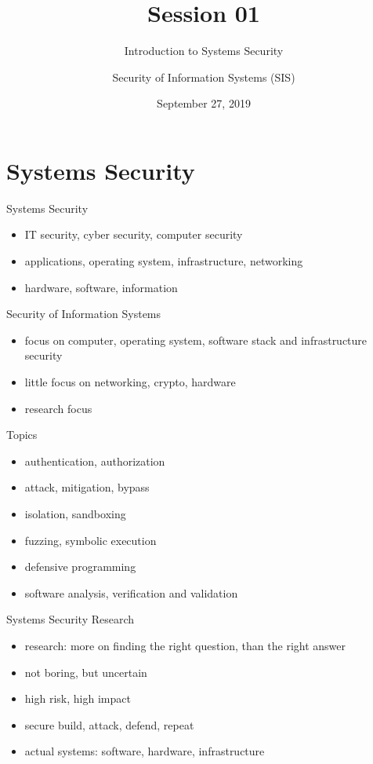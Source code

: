\documentclass{curs}
\title[Session 01]{Session 01}
\subtitle{Introduction to Systems Security}
\author{Security of Information Systems (SIS)}
\date{September 27, 2019}
\begin{document}
\frame{\titlepage}


\section{Systems Security}

\begin{frame}{Systems Security}
  \begin{itemize}
    \pause \item IT security, cyber security, computer security
    \pause \item applications, operating system, infrastructure, networking
    \pause \item hardware, software, information
  \end{itemize}
\end{frame}

\begin{frame}{Security of Information Systems}
  \begin{itemize}
    \pause \item focus on computer, operating system, software stack and infrastructure security
    \pause \item little focus on networking, crypto, hardware
    \pause \item research focus
  \end{itemize}
\end{frame}

\begin{frame}{Topics}
  \begin{itemize}
    \pause \item authentication, authorization
    \pause \item attack, mitigation, bypass
    \pause \item isolation, sandboxing
    \pause \item fuzzing, symbolic execution
    \pause \item defensive programming
    \pause \item software analysis, verification and validation
  \end{itemize}
\end{frame}

\begin{frame}{Systems Security Research}
  \begin{itemize}
    \pause \item research: more on finding the right question, than the right answer
    \pause \item not boring, but uncertain
    \pause \item high risk, high impact
    \pause \item secure build, attack, defend, repeat
    \pause \item actual systems: software, hardware, infrastructure
  \end{itemize}
\end{frame}
\end{document}
